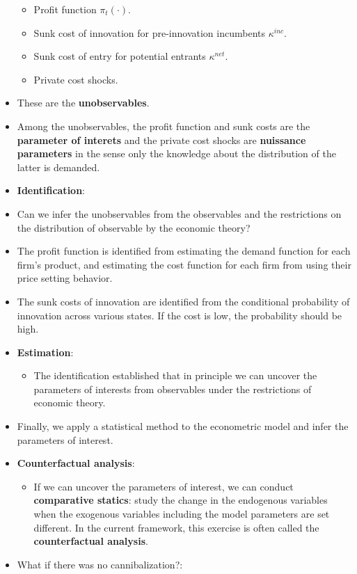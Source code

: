\documentclass[
]{book}
\providecommand{\tightlist}{%
  \setlength{\itemsep}{0pt}\setlength{\parskip}{0pt}}
\begin{document}
\begin{itemize}
  \begin{itemize}
  \tightlist
  \item
    Profit function \(\pi_t(\cdot)\).
  \item
    Sunk cost of innovation for pre-innovation incumbents \(\kappa^{inc}\).
  \item
    Sunk cost of entry for potential entrants \(\kappa^{net}\).
  \item
    Private cost shocks.
  \end{itemize}
\item
  These are the \textbf{unobservables}.
\item
  Among the unobservables, the profit function and sunk costs are the \textbf{parameter of interets} and the private cost shocks are \textbf{nuissance parameters} in the sense only the knowledge about the distribution of the latter is demanded.
\item
  \textbf{Identification}:
\item
  Can we infer the unobservables from the observables and the restrictions on the distribution of observable by the economic theory?
\item
  The profit function is identified from estimating the demand function for each firm's product, and estimating the cost function for each firm from using their price setting behavior.
\item
  The sunk costs of innovation are identified from the conditional probability of innovation across various states. If the cost is low, the probability should be high.
\item
  \textbf{Estimation}:

  \begin{itemize}
  \tightlist
  \item
    The identification established that in principle we can uncover the parameters of interests from observables under the restrictions of economic theory.
  \end{itemize}
\item
  Finally, we apply a statistical method to the econometric model and infer the parameters of interest.
\item
  \textbf{Counterfactual analysis}:

  \begin{itemize}
  \tightlist
  \item
    If we can uncover the parameters of interest, we can conduct \textbf{comparative statics}: study the change in the endogenous variables when the exogenous variables including the model parameters are set different. In the current framework, this exercise is often called the \textbf{counterfactual analysis}.
  \end{itemize}
\item
  What if there was no cannibalization?:


\end{itemize}
\end{document}

